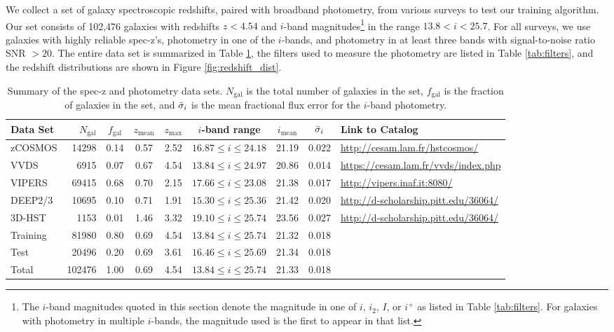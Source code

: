 
\label{sect:data}

We collect a set of galaxy spectroscopic redshifts, paired with broadband photometry, from various surveys to test our training algorithm.
Our set consists of 102,476 galaxies with redshifts $z < 4.54$ and $i$-band magnitudes\footnote{The $i$-band magnitudes quoted in this section denote the magnitude in one of $i$, $i_2$, $I$, or $i^+$ as listed in Table \ref{tab:filters}. For galaxies with photometry in multiple $i$-bands, the magnitude used is the first to appear in that list.} in the range $13.8 < i < 25.7$.
For all surveys, we use galaxies with highly reliable spec-z's, photometry in one of the $i$-bands, and photometry in at least three bands with signal-to-noise ratio SNR $> 20$.
The entire data set is summarized in Table \ref{tab:data_sets}, the filters used to measure the photometry are listed in Table \ref{tab:filters}, and the redshift distributions are shown in Figure \ref{fig:redshift_dist}.

\begin{table}
    \caption{Summary of the spec-z and photometry data sets. $N_\text{gal}$ is the total number of galaxies in the set, $f_\text{gal}$ is the fraction of galaxies in the set, and $\Bar{\sigma}_i$ is the mean fractional flux error for the $i$-band photometry.}
    \label{tab:data_sets}
    \centering
    \begin{tabular}{l r c c c c c c l}
        \hline \hline
        Data Set & $N_\text{gal}$ & $f_\text{gal}$ & $z_\text{mean}$ & $z_\text{max}$ & $i$-band range & $i_\text{mean}$ & $\Bar{\sigma}_i$ & Link to Catalog \\
        \hline
        
        zCOSMOS  &  14298 & 0.14 & 0.57 & 2.52 & $16.87 \leq i \leq 24.18$ & 21.19 & 0.022 & \url{http://cesam.lam.fr/hstcosmos/} \\
        VVDS     &   6915 & 0.07 & 0.67 & 4.54 & $13.84 \leq i \leq 24.97$ & 20.86 & 0.014 & \url{https://cesam.lam.fr/vvds/index.php} \\
        VIPERS   &  69415 & 0.68 & 0.70 & 2.15 & $17.66 \leq i \leq 23.08$ & 21.38 & 0.017 & \url{http://vipers.inaf.it:8080/} \\
        DEEP2/3  &  10695 & 0.10 & 0.71 & 1.91 & $15.30 \leq i \leq 25.36$ & 21.42 & 0.020 & \url{http://d-scholarship.pitt.edu/36064/} \\
        3D-HST   &   1153 & 0.01 & 1.46 & 3.32 & $19.10 \leq i \leq 25.74$ & 23.56 & 0.027 & \url{http://d-scholarship.pitt.edu/36064/} \\
        \hline
        Training &  81980 & 0.80 & 0.69 & 4.54 & $13.84 \leq i \leq 25.74$ & 21.32 & 0.018 & \\
        Test     &  20496 & 0.20 & 0.69 & 3.61 & $16.46 \leq i \leq 25.69$ & 21.34 & 0.018 & \\
        \hline
        Total    & 102476 & 1.00 & 0.69 & 4.54 & $13.84 \leq i \leq 25.74$ & 21.33 & 0.018 & \\
        
        \hline
    \end{tabular}
\end{table}

